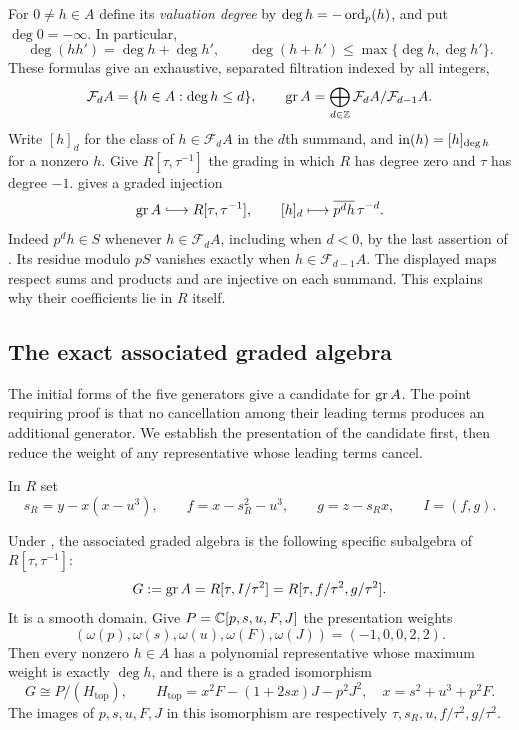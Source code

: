 For $0\ne h\in A$ define its \emph{valuation degree} by
$\deg h=-\operatorname{ord}_p(h)$, and put $\deg 0=-\infty$.  In particular,
\[
 \deg(hh')=\deg h+\deg h',\qquad
 \deg(h+h')\leq\max\{\deg h,\deg h'\}.
\]
These formulas give an exhaustive, separated filtration indexed by all
integers,
\[
 \mathcal F_dA=\{h\in A:\deg h\leq d\},\qquad
 \operatorname{gr} A=\bigoplus_{d\in\mathbb Z}\mathcal F_dA/\mathcal F_{d-1}A.
\]
Write $[h]_d$ for the class of $h\in\mathcal F_dA$ in the $d$th
summand, and $\operatorname{in}(h)=[h]_{\deg h}$ for a nonzero $h$.
Give $R[\tau,\tau^{-1}]$ the grading in which $R$ has degree zero
and $\tau$ has degree $-1$.   gives a graded
injection
\begin{equation}\label{deg:graded-injection}
 \gr A\lhook\joinrel\longrightarrow R[\tau,\tau^{-1}],
 \qquad
 [h]_d\longmapsto \overline{p^dh}\,\tau^{-d}.
\end{equation}
Indeed $p^dh\in S$ whenever $h\in\mathcal F_dA$, including when
$d<0$, by the last assertion of .  Its residue
modulo $pS$ vanishes exactly when $h\in\mathcal F_{d-1}A$.
The displayed maps respect sums and products and are injective on
each summand.  This explains why their coefficients lie in $R$
itself.

\subsection{The exact associated graded algebra}

The initial forms of the five generators give a candidate for $\operatorname{gr} A$.
The point requiring proof is that no cancellation among their leading
terms produces an additional generator. We establish the presentation
of the candidate first, then reduce the weight of any representative
whose leading terms cancel.

In $R$ set
\begin{equation}\label{deg:center}
 s_R=y-x(x-u^3),\qquad
 f=x-s_R^2-u^3,\qquad
 g=z-s_Rx,\qquad I=(f,g).
\end{equation}

\begin{proposition}\label{prop:graded}
Under , the associated graded algebra is
the following specific subalgebra of $R[\tau,\tau^{-1}]$:
\begin{equation}\label{deg:G}
 G:=\operatorname{gr} A
   =R[\tau,I/\tau^2]
   =R[\tau,f/\tau^2,g/\tau^2].
\end{equation}
It is a smooth domain.  Give $P=\mathbb C[p,s,u,F,J]$ the presentation
weights
\begin{equation}\label{deg:presentation-weights}
 (\omega(p),\omega(s),\omega(u),\omega(F),\omega(J))
       =(-1,0,0,2,2).
\end{equation}
Then every nonzero $h\in A$ has a polynomial representative whose
maximum weight is exactly $\deg h$, and there is a graded isomorphism
\begin{equation}\label{deg:graded-presentation}
 G\cong P/(H_{\mathrm{top}}),\qquad
 H_{\mathrm{top}}=x^2F-(1+2sx)J-p^2J^2,
 \quad x=s^2+u^3+p^2F.
\end{equation}
The images of $p,s,u,F,J$ in this isomorphism are respectively
$\tau,s_R,u,f/\tau^2,g/\tau^2$.
\end{proposition}

